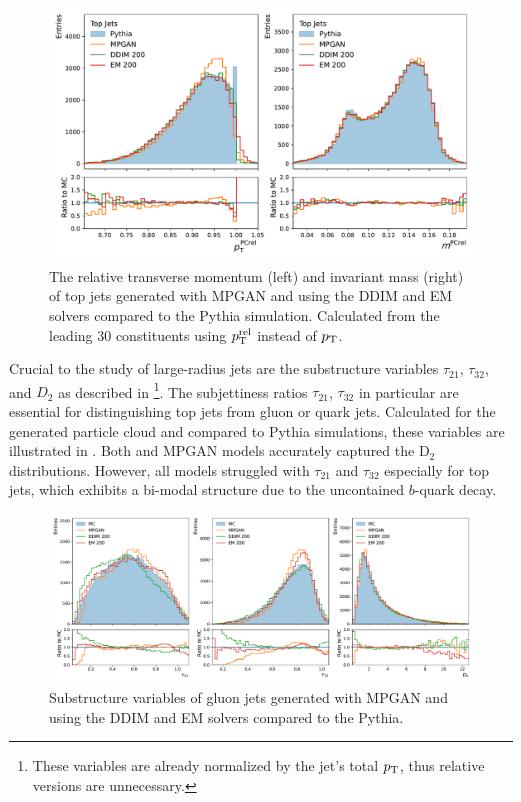 \begin{figure}[hbpt]
    \centering
    \includegraphics[width=.75\linewidth]{Figures/jet_generation/jedi/top/jet_features_rel.pdf}
    \caption{The relative transverse momentum (left) and invariant mass (right) of top jets generated with MPGAN and \pcjedi using the DDIM and EM solvers compared to the Pythia simulation. Calculated from the leading 30 \pt constituents using $p_\mathrm{T}^\text{rel}$ instead of $p_\mathrm{T}$.}
    \label{fig:kinematics_top}
\end{figure}

Crucial to the study of large-radius jets are the substructure variables $\tau_{21}$, $\tau_{32}$, and $D_2$ as described in \footnote{These variables are already normalized by the jet's total $p_\mathrm{T}$, thus relative versions are unnecessary.}.
The subjettiness ratios $\tau_{21}$, $\tau_{32}$ in particular are essential for distinguishing top jets from gluon or quark jets.
Calculated for the generated particle cloud and compared to Pythia simulations, these variables are illustrated in .
Both \pcjedi and MPGAN models accurately captured the $\text{D}_2$ distributions.
However, all models struggled with $\tau_{21}$ and $\tau_{32}$ especially for top jets, which exhibits a bi-modal structure due to the uncontained $b$-quark decay.

\begin{figure}[hbpt]
    \centering
    \includegraphics[width=1.\linewidth]{Figures/jet_generation/jedi/gluon/jet_substructure_rel.pdf}
    \caption{Substructure variables of gluon jets generated with MPGAN and \pcjedi using the DDIM and EM solvers compared to the Pythia.}
    \label{fig:substructure_gluon}
\end{figure}

